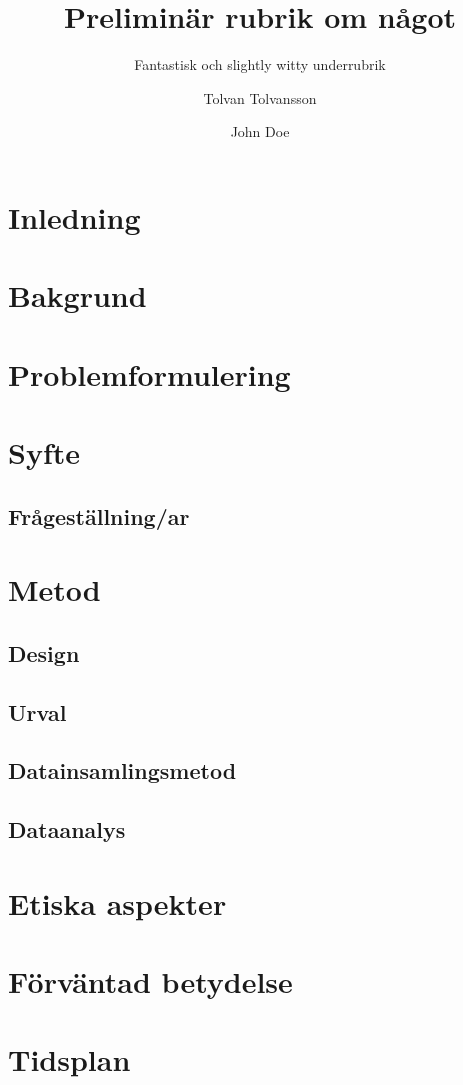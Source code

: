 \documentclass[
    a4paper,
    12pt,
    halfparskip,
]{rkhpm}
\title{Preliminär rubrik om något}
\subtitle{Fantastisk och slightly witty underrubrik}
\author{Tolvan Tolvansson \and John Doe}
\begin{document}
 

\maketitle
\thispagestyle{empty}
\setcounter{page}{0}

\section*{Inledning}

\lipsum
\section*{Bakgrund}

\lipsum
\section*{Problemformulering}

\lipsum
\section*{Syfte}

\subsection*{Frågeställning/ar}

\lipsum
\section*{Metod}

\subsection*{Design}

\subsection*{Urval}

\subsection*{Datainsamlingsmetod}

\subsection*{Dataanalys}

\lipsum
\section*{Etiska aspekter}

\lipsum
\section*{Förväntad betydelse}

%

\lipsum
\section*{Tidsplan}

\lipsum
\end{document}
